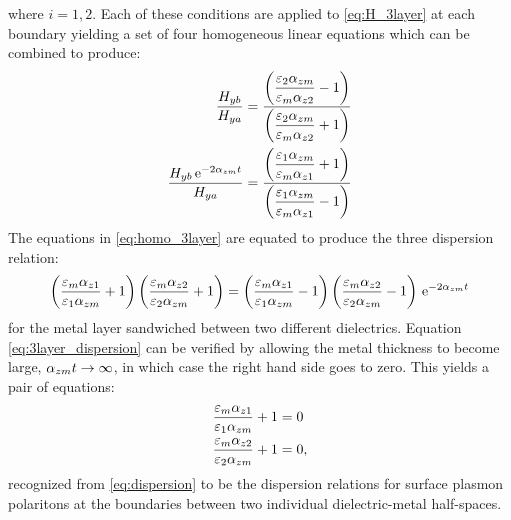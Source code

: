 \documentclass[11pt]{article}
\begin{document}
%
where $i = 1,2$. Each of these conditions are applied to \eqref{eq:H_3layer} at each boundary yielding a set of four homogeneous linear equations which can be combined to produce:
%
\begin{subequations}
  \begin{align}
    \frac{H_{yb}}{H_{ya}} ={}& \frac{\displaystyle \left(\frac{\varepsilon_2 \alpha_{zm}}{\varepsilon_m \alpha_{z2}} - 1 \right)}{\displaystyle \left(\frac{\varepsilon_2 \alpha_{zm}}{\varepsilon_m \alpha_{z2}} + 1 \right)}
    \label{eq:homo1_3layer}\\
    \frac{H_{yb} \, \mathrm{e}^{-2 \alpha_{zm}t}}{H_{ya}} ={}& \frac{\displaystyle \left(\frac{\varepsilon_1 \alpha_{zm}}{\varepsilon_m \alpha_{z1}} + 1 \right)}{\displaystyle \left(\frac{\varepsilon_1 \alpha_{zm}}{\varepsilon_m \alpha_{z1}} - 1 \right)}
    \label{eq:homo2_3layer}
  \end{align}
  \label{eq:homo_3layer}
\end{subequations}
%
The equations in \eqref{eq:homo_3layer} are equated to produce the three dispersion relation:
%
\begin{equation}
  \left(\frac{\varepsilon_m \alpha_{z1}}{\varepsilon_1 \alpha_{zm}} + 1 \right) \left(\frac{\varepsilon_m \alpha_{z2}}{\varepsilon_2 \alpha_{zm}} + 1 \right) = \left(\frac{\varepsilon_m \alpha_{z1}}{\varepsilon_1 \alpha_{zm}} - 1 \right) \left(\frac{\varepsilon_m \alpha_{z2}}{\varepsilon_2 \alpha_{zm}} - 1 \right) \, \mathrm{e}^{-2\alpha_{zm}t}
  \label{eq:3layer_dispersion}
\end{equation}
%
for the metal layer sandwiched between two different dielectrics. Equation \eqref{eq:3layer_dispersion} can be verified by allowing the metal thickness to become large, $\alpha_{zm}t \rightarrow \infty$, in which case the right hand side goes to zero. This yields a pair of equations:
%
\begin{subequations}
  \begin{align}
    \frac{\varepsilon_m \alpha_{z1}}{\varepsilon_1 \alpha_{zm}} + 1 ={}& 0
    \label{eq:simplified1_3layer_to2layer}\\
    \frac{\varepsilon_m \alpha_{z2}}{\varepsilon_2 \alpha_{zm}} + 1 ={}& 0,
    \label{eq:simplified2_3layer_to2layer}
  \end{align}
  \label{eq:simplified_3layer_to2layer}
\end{subequations}
%
recognized from \eqref{eq:dispersion} to be the dispersion relations for surface plasmon polaritons at the boundaries between two individual dielectric-metal half-spaces.
\end{document}
